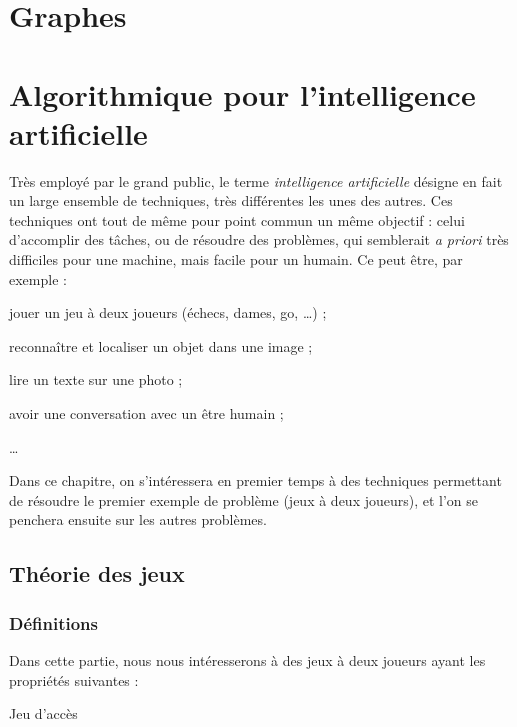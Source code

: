 \documentclass[a4paper,french,bookmarks]{book}
\newcommand{\chaptertoc}[0]{
    \begin{tcolorbox}[
        enhanced,
        frame hidden,
        sharp corners,
        detach title,
        spread outwards     = 5pt,
        halign              = center,
        valign              = center,
        borderline west     = {3pt}{0pt}{main20!50!main2!95!gray!90},
        coltitle            = main20!50!main2!95!gray!90, 
        interior style      = {
            left color      = main1white2!65!gray!11,
            middle color    = main1white2!50!gray!10,
            right color     = main1white2!35!gray!9
        },
        arc                 = 0 cm,
        title               = SOMMAIRE,
        boxrule             = 0pt,
        fonttitle           = \bfseries\sffamily,
        overlay             = {
            \node[rotate=90, minimum width=1cm, anchor=south,yshift=-0.8cm]
            at (frame.west) {\tcbtitle};
        }
    ]
        \begin{minipage}{0.83\linewidth}
            \sffamily
            \minitoc
        \end{minipage}
    \end{tcolorbox}
}
\begin{document}
        

    \chapter{Graphes}
    
    \chapter{Algorithmique pour l'intelligence artificielle}
    
    Très employé par le grand public, le terme \emph{intelligence artificielle} désigne en fait un large ensemble de techniques, très différentes les unes des autres. Ces techniques ont tout de même pour point commun un même objectif : celui d'accomplir des tâches, ou de résoudre des problèmes, qui semblerait \emph{a priori} très difficiles pour une machine, mais facile pour un humain. Ce peut être, par exemple :
    \begin{enumerate}
        \itt jouer un jeu à deux joueurs (échecs, dames, go, \dots) ;
        
        \itt reconnaître et localiser un objet dans une image ;
        
        \itt lire un texte sur une photo ;
        
        \itt avoir une conversation avec un être humain ;
        
        \itt \dots
    \end{enumerate}
    Dans ce chapitre, on s'intéressera en premier temps à des techniques permettant de résoudre le premier exemple de problème (jeux à deux joueurs), et l'on se penchera ensuite sur les autres problèmes.
    
    \chaptertoc{}
    
    \section{Théorie des jeux}
    
    \subsection{Définitions}
    
    Dans cette partie, nous nous intéresserons à des jeux à deux joueurs ayant les propriétés suivantes :
    
    \begin{definition}{Jeu d'accès}{}
        
    \end{definition}
    
\end{document}
